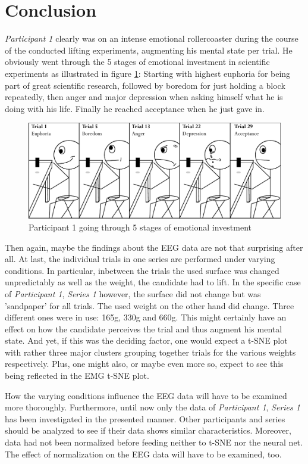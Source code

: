 \documentclass{article} %
\begin{document}
\section{Conclusion}
\emph{Participant 1} clearly was on an intense emotional rollercoaster during the course of the conducted lifting experiments, augmenting his mental state per trial. He obviously went through the 5 stages of emotional investment in scientific experiments as illustrated in figure \ref{fig:stickman}: Starting with highest euphoria for being part of great scientific research, followed by boredom for just holding a block repeatedly, then anger and major depression when asking himself what he is doing with his life. Finally he reached acceptance when he just gave in.

\begin{figure}[h]
	\centering
	\includegraphics[width=1.0\textwidth]{stickman.pdf}
	\caption{Participant 1 going through 5 stages of emotional investment}
	\label{fig:stickman}
\end{figure}

Then again, maybe the findings about the EEG data are not that surprising after all. At last, the individual trials in one series are performed under varying conditions. In particular, inbetween the trials the used surface was changed unpredictably as well as the weight, the candidate had to lift. In the specific case of \emph{Participant 1}, \emph{Series 1} however, the surface did not change but was 'sandpaper' for all trials. The used weight on the other hand did change. Three different ones were in use: 165g, 330g and 660g. This might certainly have an effect on how the candidate perceives the trial and thus augment his mental state. And yet, if this was the deciding factor, one would expect a t-SNE plot with rather three major clusters grouping together trials for the various weights respectively. Plus, one might also, or maybe even more so, expect to see this being reflected in the EMG t-SNE plot.

How the varying conditions influence the EEG data will have to be examined more thoroughly. Furthermore, until now only the data of \emph{Participant 1}, \emph{Series 1} has been investigated in the presented manner. Other participants and series should be analyzed to see if their data shows similar characteristics.
Moreover, data had not been normalized before feeding neither to t-SNE nor the neural net. The effect of normalization on the EEG data will have to be examined, too.
\end{document}
